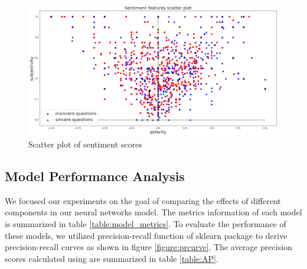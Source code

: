 \documentclass[12pt]{diazessay} %
\begin{document}
\begin{figure}
     \includegraphics[width=\textwidth]{graphs/sentiment_scatter.png}
     \caption{Scatter plot of sentiment scores}
     \label{sentiment_scatter}
 \end{figure} 


\subsection{Model Performance Analysis} %
\label{sub:model_performance_analysis}

We focused our experiments on the goal of comparing the effects of different components in our neural networks model. The metrics information of each model is summarized in table \ref{table:model_metrics}. To evaluate the performance of these models, we utilized precision-recall function of sklearn package to derive precision-recall curves as shown in figure \ref{figure:prcurve}. The average precision scores calculated using  are summarized in table \ref{table:AP}.
\end{document}
